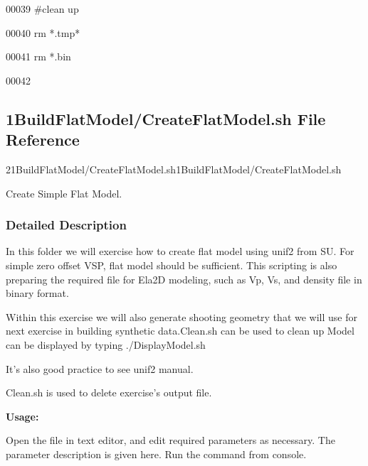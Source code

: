 \documentclass{article}
\begin{document}
\vspace{4pt}
00039 \#clean up\label{l00040}

\vspace{4pt}
00040 rm *.tmp*\label{l00041}

\vspace{4pt}
00041 rm *.bin\label{l00042}

\vspace{4pt}
00042 \newpage

\newpage
\vspace{12pt}
\subsection*{{\large{}\textbf{1BuildFlatModel/CreateFlatModel.sh File Reference}}}

\vspace{12pt}
21BuildFlatModel/CreateFlatModel.sh1BuildFlatModel/CreateFlatModel.sh\label{AAAAAAAAAC}

\vspace{12pt}
Create Simple Flat Model. 

\vspace{24pt}
\subsubsection*{\textbf{Detailed Description}}

\vspace{1pt}
In this folder we will exercise how to create flat model using unif2 from SU. For 
simple zero offset VSP, flat model should be sufficient. This scripting is also 
preparing the required file for Ela2D modeling, such as Vp, Vs, and density file 
in binary format.

\vspace{1pt}
Within this exercise we will also generate shooting geometry that we will use for 
next exercise in building synthetic data.Clean.sh can be used to clean up Model 
can be displayed by typing ./DisplayModel.sh

\vspace{1pt}
It's also good practice to see unif2 manual. 

\vspace{1pt}
Clean.sh is used to delete exercise's output file.

\vspace{4pt}
\textbf{Usage:}

\vspace{4pt}
Open the file in text editor, and edit required parameters as necessary. The parameter 
description is given here. Run the command from console. 
\end{document}
